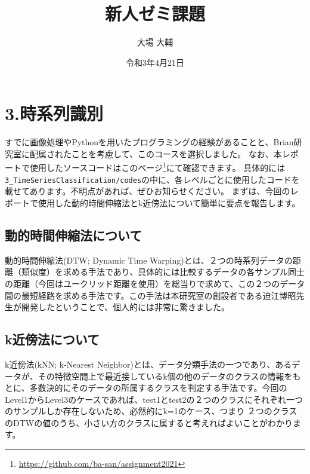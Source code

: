 




\graphicspath{{./pic/}}
\setlength{\textwidth}{16.2cm}%
\setlength{\textheight}{23cm}%
\setlength{\topmargin}{-1.5cm}
\setlength{\oddsidemargin}{0cm}
\setlength{\evensidemargin}{0cm}
\setlength{\parskip}{1pt}
\pagestyle{fancy}
\title{新人ゼミ課題}
\author{大場 大輔}
\date{令和3年4月21日}


	\maketitle
	\vspace*{20pt}

	
\section*{3.時系列識別}
すでに画像処理やPythonを用いたプログラミングの経験があることと、Brian研究室に配属されたことを考慮して、このコースを選択しました。
なお、本レポートで使用したソースコードはこのページ\footnote{\url{https://github.com/ba-san/assignment2021}}にて確認できます。
具体的には\verb+3_TimeSeriesClassification/codes+の中に、各レベルごとに使用したコードを載せてあります。不明点があれば、ぜひお知らせください。
まずは、今回のレポートで使用した動的時間伸縮法とk近傍法について簡単に要点を報告します。

\subsection*{動的時間伸縮法について}
動的時間伸縮法(DTW; Dynamic Time Warping)とは、２つの時系列データの距離（類似度）を求める手法であり、具体的には比較するデータの各サンプル同士の距離（今回はユークリッド距離を使用）を総当りで求めて、この２つのデータ間の最短経路を求める手法です。この手法は本研究室の創設者である迫江博昭先生が開発したということで、個人的には非常に驚きました。

\subsection*{k近傍法について}
k近傍法(kNN; k-Nearest Neighbor)とは、データ分類手法の一つであり、あるデータが、その特徴空間上で最近接しているk個の他のデータのクラスの情報をもとに、多数決的にそのデータの所属するクラスを判定する手法です。今回のLevel1からLevel3のケースであれば、test1とtest2の２つのクラスにそれぞれ一つのサンプルしか存在しないため、必然的にk=1のケース、つまり
２つのクラスのDTWの値のうち、小さい方のクラスに属すると考えればよいことがわかります。

